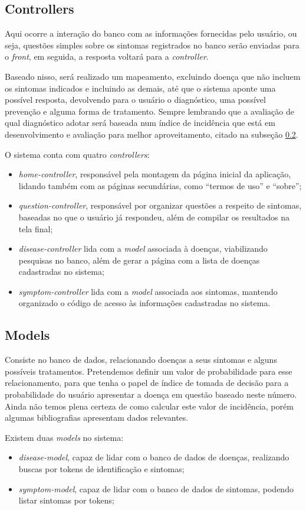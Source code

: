 \subsection{Controllers}

Aqui ocorre a interação do banco com as informações fornecidas pelo usuário, ou seja, questões simples sobre os sintomas registrados no banco serão enviadas para o \emph{front}, em seguida, a resposta voltará para a \emph{controller}.

Baseado nisso, será realizado um mapeamento, excluindo doença que não incluem os sintomas indicados e incluindo as demais, até que o sistema aponte uma possível resposta, devolvendo para o usuário o diagnóstico, uma possível prevenção e alguma forma de tratamento.
Sempre lembrando que a avaliação de qual diagnóstico adotar será baseada num índice de incidência que está em desenvolvimento e avaliação para melhor aproveitamento, citado na subseção \ref{ssec:models}.

O sistema conta com quatro \emph{controllers}:

\begin{itemize}
	\item \emph{home-controller}, responsável pela montagem da página inicial da aplicação, lidando também com as páginas secundárias, como ``termos de uso'' e ``sobre'';
	\item \emph{question-controller}, responsável por organizar questões a respeito de sintomas, baseadas no que o usuário já respondeu, além de compilar os resultados na tela final;
	\item \emph{disease-controller} lida com a \emph{model} associada à doenças, viabilizando pesquisas no banco, além de gerar a página com a lista de doenças cadastradas no sistema;
	\item \emph{symptom-controller} lida com a \emph{model} associada aos sintomas, mantendo organizado o código de acesso às informações cadastradas no sistema.
\end{itemize}

\subsection{Models}\label{ssec:models}

Consiste no banco de dados, relacionando doenças a seus sintomas e alguns possíveis tratamentos.
Pretendemos definir um valor de probabilidade para esse relacionamento, para que tenha o papel de índice de tomada de decisão para a probabilidade do usuário apresentar a doença em questão baseado neste número.
Ainda não temos plena certeza de como calcular este valor de incidência, porém algumas bibliografias apresentam dados relevantes\cite{AlbertEinstein, longo2011harrison}.

Existem duas \emph{models} no sistema:

\begin{itemize}
	\item \emph{disease-model}, capaz de lidar com o banco de dados de doenças, realizando buscas por tokens de identificação e sintomas;
	\item \emph{symptom-model}, capaz de lidar com o banco de dados de sintomas, podendo listar sintomas por tokens;
\end{itemize}
